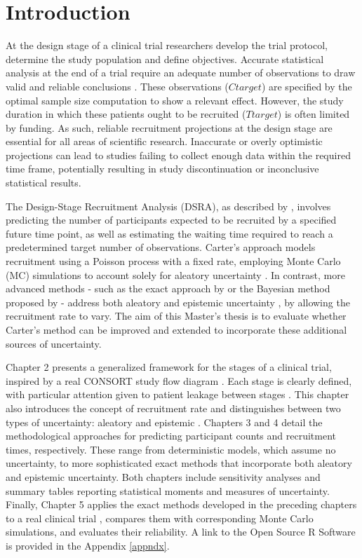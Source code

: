 


\chapter{Introduction}

At the design stage of a clinical trial researchers develop the trial protocol, determine the study population and define objectives. Accurate statistical analysis at the end of a trial require an adequate number of observations to draw valid and reliable conclusions \citep{panos2023statistical}. These observations ($Ctarget$) are specified by the optimal sample size computation to show a relevant effect. However, the study duration in which these patients ought to be recruited ($Ttarget$) is often limited by funding. As such, reliable recruitment projections at the design stage are essential for all areas of scientific research. Inaccurate or overly optimistic projections can lead to studies failing to collect enough data within the required time frame, potentially resulting in study discontinuation or inconclusive statistical results.

The Design-Stage Recruitment Analysis (DSRA), as described by \cite{carter2004application}, involves predicting the number of participants expected to be recruited by a specified future time point, as well as estimating the waiting time required to reach a predetermined target number of observations. Carter's approach models recruitment using a Poisson process with a fixed rate, employing Monte Carlo (MC) simulations to account solely for aleatory uncertainty \citep{ohagan2006}. In contrast, more advanced methods - such as the exact approach by \cite{anisimov2007modelling} or the Bayesian method proposed by \cite{bagiella2001predicting} - address both aleatory and epistemic uncertainty \citep{ohagan2006}, by allowing the recruitment rate to vary. The aim of this Master's thesis is to evaluate whether Carter's method can be improved and extended to incorporate these additional sources of uncertainty.

Chapter 2 presents a generalized framework for the stages of a clinical trial, inspired by a real CONSORT study flow diagram \citep{schulz2010consort, hopewell2025consort}. Each stage is clearly defined, with particular attention given to patient leakage between stages \citep{desai2014preventing}. This chapter also introduces the concept of recruitment rate and distinguishes between two types of uncertainty: aleatory and epistemic \citep{ohagan2006}. Chapters 3 and 4 detail the methodological approaches for predicting participant counts and recruitment times, respectively. These range from deterministic models, which assume no uncertainty, to more sophisticated exact methods that incorporate both aleatory and epistemic uncertainty. Both chapters include sensitivity analyses and summary tables reporting statistical moments and measures of uncertainty. Finally, Chapter 5 applies the exact methods developed in the preceding chapters to a real clinical trial \citep{carter2004application}, compares them with corresponding Monte Carlo simulations, and evaluates their reliability. A link to the Open Source R Software is provided in the Appendix \ref{appndx}.

